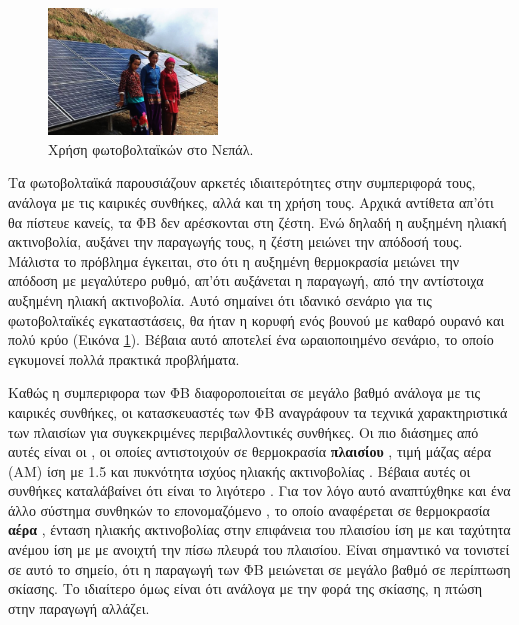 \documentclass[12pt]{report}
\begin{document}
\begin{figure}
				\includegraphics[width=0.4\textwidth]{nepal}
				\captionsetup{name=Εικόνα}
				\caption{Χρήση φωτοβολταϊκών στο Νεπάλ.}
				\label{fig:nepal}
\end{figure}

Τα φωτοβολταϊκά παρουσιάζουν αρκετές ιδιαιτερότητες στην συμπεριφορά τους, ανάλογα με τις καιρικές συνθήκες, αλλά και τη χρήση τους. Αρχικά αντίθετα απ'ότι θα πίστευε κανείς, τα ΦΒ δεν αρέσκονται στη ζέστη. 
Ενώ δηλαδή η αυξημένη ηλιακή ακτινοβολία, αυξάνει
την παραγωγής τους, η ζέστη μειώνει την απόδοσή τους. Μάλιστα το πρόβλημα έγκειται, στο ότι η αυξημένη θερμοκρασία μειώνει την απόδοση με μεγαλύτερο ρυθμό, απ'ότι αυξάνεται η παραγωγή, από την αντίστοιχα αυξημένη ηλιακή ακτινοβολία. 
Αυτό σημαίνει ότι ιδανικό σενάριο για τις φωτοβολταϊκές εγκαταστάσεις, θα ήταν η κορυφή ενός βουνού με καθαρό ουρανό και πολύ κρύο (Εικόνα \ref{fig:nepal}). Βέβαια αυτό αποτελεί ένα ωραιοποιημένο σενάριο, το οποίο 
εγκυμονεί πολλά πρακτικά προβλήματα.

Καθώς η συμπεριφορα των ΦΒ διαφοροποιείται σε μεγάλο βαθμό ανάλογα με τις καιρικές συνθήκες, οι κατασκευαστές των ΦΒ αναγράφουν τα τεχνικά χαρακτηριστικά των πλαισίων για συγκεκριμένες περιβαλλοντικές συνθήκες. Οι πιο διάσημες
από αυτές είναι οι {}, οι οποίες αντιστοιχούν σε θερμοκρασία \textbf{πλαισίου} {}, τιμή μάζας αέρα (ΑΜ) ίση με 1.5 και πυκνότητα ισχύος ηλιακής ακτινοβολίας 
{}. Βέβαια αυτές οι συνθήκες καταλάβαίνει ότι είναι το λιγότερο . Για τον λόγο αυτό αναπτύχθηκε και ένα άλλο σύστημα συνθηκών το επονομαζόμενο {},
το οποίο αναφέρεται σε θερμοκρασία \textbf{αέρα} {}, ένταση ηλιακής ακτινοβολίας στην επιφάνεια του πλαισίου ίση με {} και ταχύτητα ανέμου ίση με {} με ανοιχτή
την πίσω πλευρά του πλαισίου. Είναι σημαντικό να τονιστεί σε αυτό το σημείο, ότι η παραγωγή των ΦΒ μειώνεται σε μεγάλο βαθμό σε περίπτωση σκίασης. Το ιδιαίτερο όμως είναι ότι ανάλογα με την φορά της σκίασης, η πτώση στην παραγωγή
αλλάζει.
\end{document}
